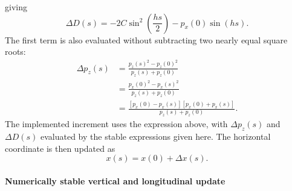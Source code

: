 giving
\begin{equation}
\Delta D(s)
=
-2C\sin^2\left(\frac{hs}{2}\right)-p_x(0)\sin(hs).
\end{equation}
The first term is also evaluated without subtracting two nearly equal square
roots:
\begin{align}
\Delta p_z(s)
&=
\frac{p_z(s)^2-p_z(0)^2}{p_z(s)+p_z(0)} \\
&=
\frac{p_x(0)^2-p_x(s)^2}{p_z(s)+p_z(0)} \\
&=
\frac{\left[p_x(0)-p_x(s)\right]\left[p_x(0)+p_x(s)\right]}
{p_z(s)+p_z(0)}.
\end{align}
The implemented increment uses the expression above, with
\(\Delta p_z(s)\) and \(\Delta D(s)\) evaluated by the stable expressions
given here.
The horizontal coordinate is then updated as
\begin{equation}
x(s) = x(0) + \Delta x(s).
\end{equation}

\paragraph{Numerically stable vertical and longitudinal update}


